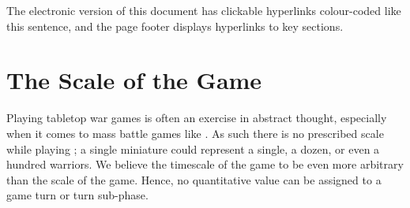 \begin{hidewhenprinted}\textcolor{linkcolour}{The electronic version of this document has clickable hyperlinks colour-coded like this sentence, and the page footer displays hyperlinks to key sections.}\end{hidewhenprinted}


\begin{center}
\begin{framed}
\license
\end{framed}
\end{center}

\noindent \latexcredit

\section{The Scale of the Game}

Playing tabletop war games is often an exercise in abstract thought, especially when it comes to mass battle games like \theninthage{}. As such there is no prescribed scale while playing \theninthage{}; a single miniature could represent a single, a dozen, or even a hundred warriors. We believe the timescale of the game to be even more arbitrary than the scale of the game. Hence, no quantitative value can be assigned to a game turn or turn sub-phase.
